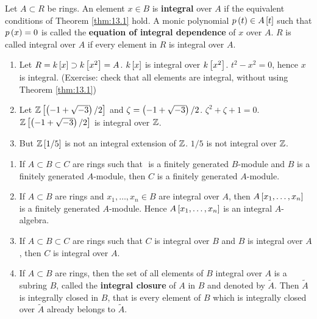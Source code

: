 \begin{definition}
Let $ A \subset R $ be rings. An element $ x \in B $ is \textbf{integral} over $ A $ if the equivalent conditions of Theorem \ref{thm:13.1} hold. A monic polynomial $ p\rb{t} \in A\sb{t} $ such that $ p\rb{x} = 0 $ is called the \textbf{equation of integral dependence} of $ x $ over $ A $. $ R $ is called integral over $ A $ if every element in $ R $ is integral over $ A $.
\end{definition}

\begin{example*}
\hfill
\begin{enumerate}
\item Let $ R = k\sb{x} \supset k\sb{x^2} = A $. $ k\sb{x} $ is integral over $ k\sb{x^2} $. $ t^2 - x^2 = 0 $, hence $ x $ is integral. (Exercise: check that all elements are integral, without using Theorem \ref{thm:13.1})
\item Let $ \Z\sb{\rb{-1 + \sqrt{-3}} / 2} $ and $ \zeta = \rb{-1 + \sqrt{-3}} / 2 $. $ \zeta^2 + \zeta + 1 = 0 $. $ \Z\sb{\rb{-1 + \sqrt{-3}} / 2} $ is integral over $ \Z $.
\item But $ \Z\sb{1 / 5} $ is not an integral extension of $ \Z $. $ 1 / 5 $ is not integral over $ \Z $.
\end{enumerate}
\end{example*}

\begin{lemma}
\hfill
\begin{enumerate}
\item If $ A \subset B \subset C $ are rings such that $  $ is a finitely generated $ B $-module and $ B $ is a finitely generated $ A $-module, then $ C $ is a finitely generated $ A $-module.
\item If $ A \subset B $ are rings and $ x_1, \dots, x_n \in B $ are integral over $ A $, then $ A\sb{x_1, \dots, x_n} $ is a finitely generated $ A $-module. Hence $ A\sb{x_1, \dots, x_n} $ is an integral $ A $-algebra.
\item If $ A \subset B \subset C $ are rings such that $ C $ is integral over $ B $ and $ B $ is integral over $ A $, then $ C $ is integral over $ A $.
\item If $ A \subset B $ are rings, then the set of all elements of $ B $ integral over $ A $ is a subring $ B $, called the \textbf{integral closure} of $ A $ in $ B $ and denoted by $ \widetilde{A} $. Then $ \widetilde{A} $ is integrally closed in $ B $, that is every element of $ B $ which is integrally closed over $ \widetilde{A} $ already belongs to $ \widetilde{A} $.
\end{enumerate}
\end{lemma}

